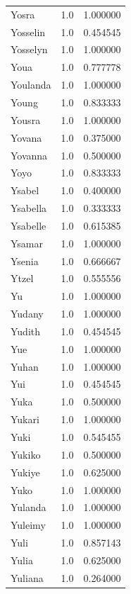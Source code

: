 \documentclass[
  letterpaper,
  DIV=11,
  numbers=noendperiod]{scrreprt}
\begin{document}
\begin{tabular}{lrr}
Yosra           &   1.0 &   1.000000 \\
Yosselin        &   1.0 &   0.454545 \\
Yosselyn        &   1.0 &   1.000000 \\
Youa            &   1.0 &   0.777778 \\
Youlanda        &   1.0 &   1.000000 \\
Young           &   1.0 &   0.833333 \\
Yousra          &   1.0 &   1.000000 \\
Yovana          &   1.0 &   0.375000 \\
Yovanna         &   1.0 &   0.500000 \\
Yoyo            &   1.0 &   0.833333 \\
Ysabel          &   1.0 &   0.400000 \\
Ysabella        &   1.0 &   0.333333 \\
Ysabelle        &   1.0 &   0.615385 \\
Ysamar          &   1.0 &   1.000000 \\
Ysenia          &   1.0 &   0.666667 \\
Ytzel           &   1.0 &   0.555556 \\
Yu              &   1.0 &   1.000000 \\
Yudany          &   1.0 &   1.000000 \\
Yudith          &   1.0 &   0.454545 \\
Yue             &   1.0 &   1.000000 \\
Yuhan           &   1.0 &   1.000000 \\
Yui             &   1.0 &   0.454545 \\
Yuka            &   1.0 &   0.500000 \\
Yukari          &   1.0 &   1.000000 \\
Yuki            &   1.0 &   0.545455 \\
Yukiko          &   1.0 &   0.500000 \\
Yukiye          &   1.0 &   0.625000 \\
Yuko            &   1.0 &   1.000000 \\
Yulanda         &   1.0 &   1.000000 \\
Yuleimy         &   1.0 &   1.000000 \\
Yuli            &   1.0 &   0.857143 \\
Yulia           &   1.0 &   0.625000 \\
Yuliana         &   1.0 &   0.264000 \\

\end{tabular}
\end{document}
